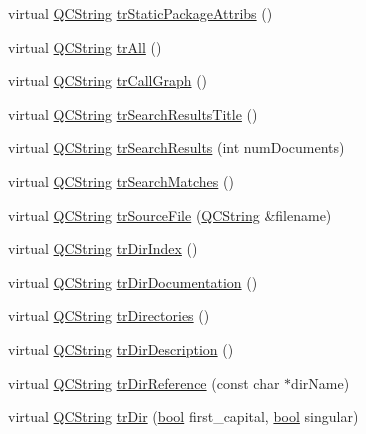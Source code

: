 \begin{DoxyCompactItemize}
\item 
virtual \hyperlink{class_q_c_string}{Q\+C\+String} \hyperlink{class_translator_serbian_cyrillic_aa0597bcc92c385ff7857e5098c0fb5d4}{tr\+Static\+Package\+Attribs} ()
\item 
virtual \hyperlink{class_q_c_string}{Q\+C\+String} \hyperlink{class_translator_serbian_cyrillic_ae0f9eceba130f83acd4845cd783e2558}{tr\+All} ()
\item 
virtual \hyperlink{class_q_c_string}{Q\+C\+String} \hyperlink{class_translator_serbian_cyrillic_ad0b36f6a9593830503690e1575114db9}{tr\+Call\+Graph} ()
\item 
virtual \hyperlink{class_q_c_string}{Q\+C\+String} \hyperlink{class_translator_serbian_cyrillic_a9f5fe6135ec55ca9daf2c4320c580dbe}{tr\+Search\+Results\+Title} ()
\item 
virtual \hyperlink{class_q_c_string}{Q\+C\+String} \hyperlink{class_translator_serbian_cyrillic_afe011ca7d20730f52c8c822b2fa668f6}{tr\+Search\+Results} (int num\+Documents)
\item 
virtual \hyperlink{class_q_c_string}{Q\+C\+String} \hyperlink{class_translator_serbian_cyrillic_aa1bd3e4ec1c320b219d32515055d27a5}{tr\+Search\+Matches} ()
\item 
virtual \hyperlink{class_q_c_string}{Q\+C\+String} \hyperlink{class_translator_serbian_cyrillic_a1875dfe0f28a1cb110700e585cee2a7a}{tr\+Source\+File} (\hyperlink{class_q_c_string}{Q\+C\+String} \&filename)
\item 
virtual \hyperlink{class_q_c_string}{Q\+C\+String} \hyperlink{class_translator_serbian_cyrillic_a1cb5135de77bcea1777a1a7c3ee227b9}{tr\+Dir\+Index} ()
\item 
virtual \hyperlink{class_q_c_string}{Q\+C\+String} \hyperlink{class_translator_serbian_cyrillic_a5a3e3b75d44c7a5c89da83714d7b11ed}{tr\+Dir\+Documentation} ()
\item 
virtual \hyperlink{class_q_c_string}{Q\+C\+String} \hyperlink{class_translator_serbian_cyrillic_a19c86d2bbfd1a361dd368ce8b18b98eb}{tr\+Directories} ()
\item 
virtual \hyperlink{class_q_c_string}{Q\+C\+String} \hyperlink{class_translator_serbian_cyrillic_a0b74ec2c3d074e381f42c6a7fa835af4}{tr\+Dir\+Description} ()
\item 
virtual \hyperlink{class_q_c_string}{Q\+C\+String} \hyperlink{class_translator_serbian_cyrillic_aa4193414ea428e8bbbac4d7880c9d2ec}{tr\+Dir\+Reference} (const char $\ast$dir\+Name)
\item 
virtual \hyperlink{class_q_c_string}{Q\+C\+String} \hyperlink{class_translator_serbian_cyrillic_a462397fedbc0d84018b5482c516b0cb8}{tr\+Dir} (\hyperlink{qglobal_8h_a1062901a7428fdd9c7f180f5e01ea056}{bool} first\+\_\+capital, \hyperlink{qglobal_8h_a1062901a7428fdd9c7f180f5e01ea056}{bool} singular)

\end{DoxyCompactItemize}
